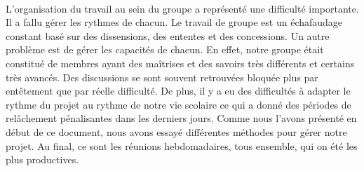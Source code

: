 \paragraph{}
L'organisation du travail au sein du groupe a représenté une difficulté importante. Il a fallu gérer les rythmes de chacun. Le travail de groupe est un échafaudage constant basé sur des dissensions, des ententes et des concessions. Un autre problème est de gérer les capacités de chacun. En effet, notre groupe était constitué de membres ayant des maîtrises et des savoirs très différents et certains très avancés. Des discussions se sont souvent retrouvées bloquée plus par entêtement que par réelle difficulté. De plus, il y a eu des difficultés à adapter le rythme du projet au rythme de notre vie scolaire ce qui a donné des périodes de relâchement pénalisantes dans les derniers jours. Comme nous l'avons présenté en début de ce document, nous avons essayé différentes méthodes pour gérer notre projet. Au final, ce sont les réunions hebdomadaires, tous ensemble, qui on été les plus productives. 